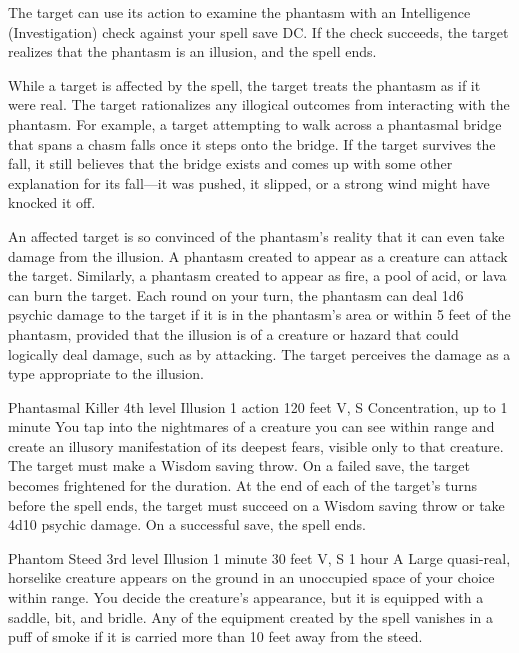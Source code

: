 \documentclass[10pt,a4paper,twoside,bg=print,twocolumn,openany,nodeprecatedcode]{dndbook}
\begin{document}
The target can use its action to examine the phantasm with an Intelligence (Investigation) check against your spell save DC. If the check succeeds, the target realizes that the phantasm is an illusion, and the spell ends.

While a target is affected by the spell, the target treats the phantasm as if it were real. The target rationalizes any illogical outcomes from interacting with the phantasm. For example, a target attempting to walk across a phantasmal bridge that spans a chasm falls once it steps onto the bridge. If the target survives the fall, it still believes that the bridge exists and comes up with some other explanation for its fall—it was pushed, it slipped, or a strong wind might have knocked it off.

An affected target is so convinced of the phantasm's reality that it can even take damage from the illusion. A phantasm created to appear as a creature can attack the target. Similarly, a phantasm created to appear as fire, a pool of acid, or lava can burn the target. Each round on your turn, the phantasm can deal 1d6 psychic damage to the target if it is in the phantasm's area or within 5 feet of the phantasm, provided that the illusion is of a creature or hazard that could logically deal damage, such as by attacking. The target perceives the damage as a type appropriate to the illusion.



\DndSpellHeader%
{Phantasmal Killer}
{4th level Illusion}
{1 action}
{120 feet}
{V, S}
{Concentration, up to 1 minute}
You tap into the nightmares of a creature you can see within range and create an illusory manifestation of its deepest fears, visible only to that creature. The target must make a Wisdom saving throw. On a failed save, the target becomes frightened for the duration. At the end of each of the target's turns before the spell ends, the target must succeed on a Wisdom saving throw or take 4d10 psychic damage. On a successful save, the spell ends.



\DndSpellHeader%
{Phantom Steed}
{3rd level Illusion}
{1 minute}
{30 feet}
{V, S}
{1 hour}
A Large quasi-real, horselike creature appears on the ground in an unoccupied space of your choice within range. You decide the creature's appearance, but it is equipped with a saddle, bit, and bridle. Any of the equipment created by the spell vanishes in a puff of smoke if it is carried more than 10 feet away from the steed.
\end{document}
